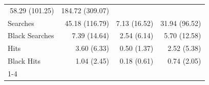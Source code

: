 \begin{table}[!h]
\begin{tabular}{llll}
  \multicolumn{1}{r}{58.29 (101.25)} &
  \multicolumn{1}{r}{184.72 (309.07)} \\
\multicolumn{1}{l}{\hspace{1em}Searches} &
  \multicolumn{1}{r}{45.18 (116.79)} &
  \multicolumn{1}{r}{7.13 (16.52)} &
  \multicolumn{1}{r}{31.94 (96.52)} \\
\multicolumn{1}{l}{\hspace{1em}Black Searches} &
  \multicolumn{1}{r}{7.39 (14.64)} &
  \multicolumn{1}{r}{2.54 (6.14)} &
  \multicolumn{1}{r}{5.70 (12.58)} \\
\multicolumn{1}{l}{\hspace{1em}Hits} &
  \multicolumn{1}{r}{3.60 (6.33)} &
  \multicolumn{1}{r}{0.50 (1.37)} &
  \multicolumn{1}{r}{2.52 (5.38)} \\
\multicolumn{1}{l}{\hspace{1em}Black Hits} &
  \multicolumn{1}{r}{1.04 (2.45)} &
  \multicolumn{1}{r}{0.18 (0.61)} &
  \multicolumn{1}{r}{0.74 (2.05)} \\
\cline{1-4}
\end{tabular}
\end{table}
